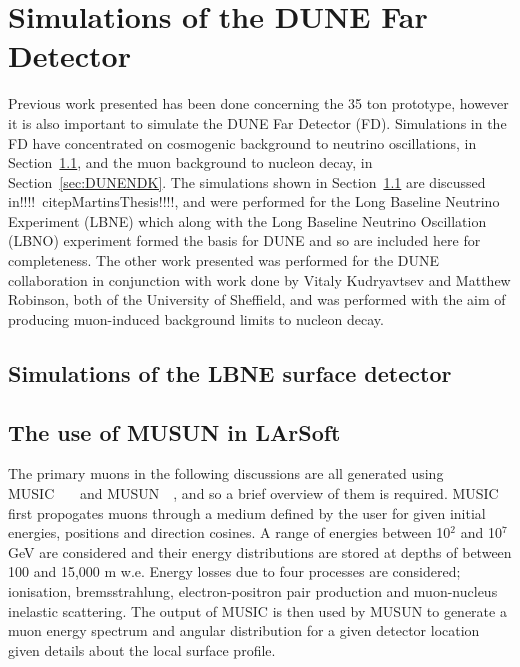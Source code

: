 
\chapter{Simulations of the DUNE Far Detector}  %
\graphicspath{{FarDetectorSimulations/Figs/Raster/}{FarDetectorSimulations/Figs/PDF/}{FarDetectorSimulations/Figs/}}

Previous work presented has been done concerning the 35 ton prototype, however it is also important to simulate the DUNE Far Detector (FD). Simulations in the FD have concentrated on cosmogenic background to neutrino oscillations, in Section~\ref{sec:LBNESurf}, and the muon background to nucleon decay, in Section~\ref{sec:DUNENDK}. The simulations shown in Section~\ref{sec:LBNESurf} are discussed in!!!!~citep{MartinsThesis}!!!!, and were performed for the Long Baseline Neutrino Experiment (LBNE) which along with the Long Baseline Neutrino Oscillation (LBNO) experiment formed the basis for DUNE and so are included here for completeness. The other work presented was performed for the DUNE collaboration in conjunction with work done by Vitaly Kudryavtsev and Matthew Robinson, both of the University of Sheffield, and was performed with the aim of producing muon-induced background limits to nucleon decay. \\

\section{Simulations of the LBNE surface detector} \label{sec:LBNESurf} %

\section{The use of MUSUN in LArSoft} \label{sec:FDIncorporation}  %
The primary muons in the following discussions are all generated using MUSIC~\citep{MUSUN}~\citep{MUSIC}~\citep{MUSIC2} and MUSUN~\citep{MUSUN}~\citep{MUSUN2}, and so a brief overview of them is required. MUSIC first propogates muons through a medium defined by the user for given initial energies, positions and direction cosines. A range of energies between 10$^2$ and 10$^7$ GeV are considered and their energy distributions are stored at depths of between 100 and 15,000 m w.e. Energy losses due to four processes are considered; ionisation, bremsstrahlung, electron-positron pair production and muon-nucleus inelastic scattering. The output of MUSIC is then used by MUSUN to generate a muon energy spectrum and angular distribution for a given detector location given details about the local surface profile. \\

